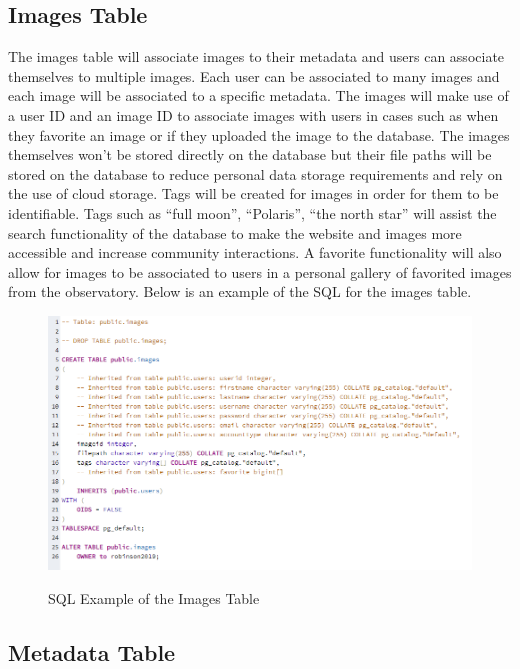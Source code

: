 \documentclass[12pt]{report}
\begin{document}
\subsection*{Images Table}

The images table will associate images to their metadata and users can associate themselves to multiple images.  Each user can be associated to many images and each image will be associated to a specific metadata.  The images will make use of a user ID and an image ID to associate images with users in cases such as when they favorite an image or if they uploaded the image to the database.  The images themselves won’t be stored directly on the database but their file paths will be stored on the database to reduce personal data storage requirements and rely on the use of cloud storage.  Tags will be created for images in order for them to be identifiable. Tags such as “full moon”, “Polaris”, “the north star” will assist the search functionality of the database to make the website and images more accessible and increase community interactions.  A favorite functionality will also allow for images to be associated to users in a personal gallery of favorited images from the observatory.  Below is an example of the SQL for the images table.

\begin{figure}[h]
	\centering
	\caption{SQL Example of the Images Table}
	\includegraphics[width=\linewidth]{database_images_table}
	\label{fig:SQL Images Table}
\end{figure}

\subsection{Metadata Table}
\end{document}
